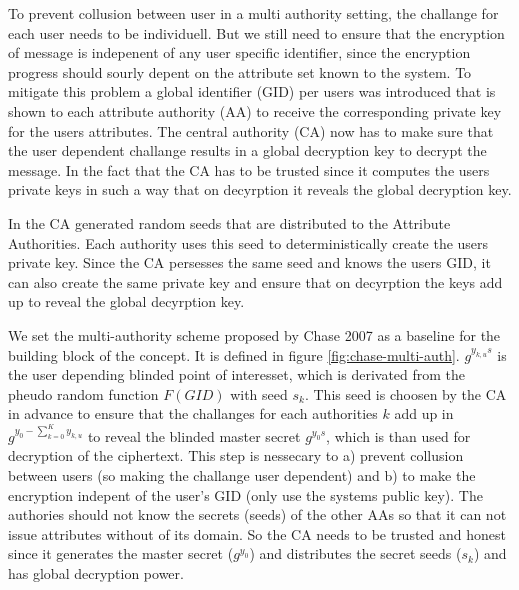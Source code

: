 \documentclass[twocolumn]{article}
\begin{document}
To prevent collusion between user in a multi authority setting, the challange for each user needs to be individuell. But we still need to ensure that the encryption of message is indepenent of any user specific identifier, since the encryption progress should sourly depent on the attribute set known to the system.
To mitigate this problem a global identifier (GID) per users was introduced that is shown to each attribute authority (AA) to receive the corresponding private key for the users attributes. 
The central authority (CA) now has to make sure that the user dependent challange results in a global decryption key to decrypt the message.
In the fact that the CA has to be trusted since it computes the users private keys in such a way that on decyrption it reveals the global decryption key. 

In \cite{case2007multi} the CA generated random seeds that are distributed to the Attribute Authorities. Each authority uses this seed to deterministically create the users private key. Since the CA persesses the same seed and knows the users GID, it can also create the same private key and ensure that on decyrption the keys add up to reveal the global decyrption key.

We set the multi-authority scheme proposed by Chase 2007 as a baseline for the building block of the concept. It is defined in figure \ref{fig:chase-multi-auth}. $g^{y_{k,u}s}$ is the user depending blinded point of interesset, which is derivated from the pheudo random function $F(GID)$ with seed $s_k$. This seed is choosen by the CA in advance to ensure that the challanges for each authorities $k$ add up in $g^{y_0 - \sum^K_{k=0} y_{k,u}}$ to reveal the blinded master secret $g^{y_0 s}$, which is than used for decryption of the ciphertext. This step is nessecary to a) prevent collusion between users (so making the challange user dependent) and b) to make the encryption indepent of the user's GID (only use the systems public key). The authories should not know the secrets (seeds) of the other AAs so that it can not issue attributes without of its domain. So the CA needs to be trusted and honest since it generates the master secret ($g^{y_0}$) and distributes the secret seeds ($s_k$) and has global decryption power.  
\end{document}
